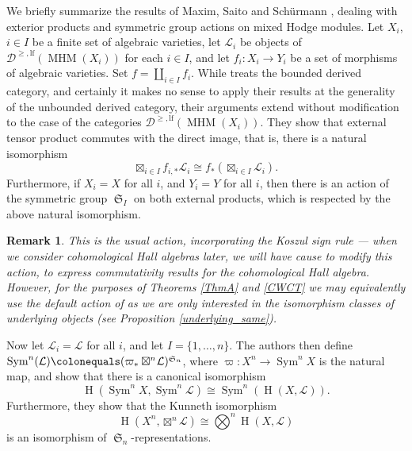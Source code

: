 \documentclass[a4paper,10pt]{amsart}
\newtheorem{remark}[theorem]{Remark}
\DeclareMathOperator{\MHM}{MHM}
\DeclareMathOperator{\Sym}{Sym}
\DeclareMathOperator{\SSym}{\mathfrak{S}}
\DeclareMathOperator{\HO}{H}
\newcommand{\Dulf}{\mathcal{D}^{\geq, \mathrm{lf}}}
\begin{document}
We briefly summarize the results of Maxim, Saito and Sch\"urmann \cite{MSS11}, dealing with exterior products and symmetric group actions on mixed Hodge modules.  Let $X_i$, $i\in I$ be a finite set of algebraic varieties, let $\mathcal{L}_i$ be objects of $\Dulf(\MHM(X_i))$ for each $i\in I$, and let $f_i\colon X_i\rightarrow Y_i$ be a set of morphisms of algebraic varieties.  Set $f=\coprod_{i\in I}f_i$.  While \cite{MSS11} treats the bounded derived category, and certainly it makes no sense to apply their results at the generality of the unbounded derived category, their arguments extend without modification to the case of the categories $\Dulf(\MHM(X_i))$.  They show that external tensor product commutes with the direct image, that is, there is a natural isomorphism
\[
\boxtimes_{i\in I}f_{i,*}\mathcal{L}_i\cong f_*\left(\boxtimes_{i\in I}\mathcal{L}_i\right).
\]
Furthermore, if $X_i=X$ for all $i$, and $Y_i=Y$ for all $i$, then there is an action of the symmetric group $\SSym_I$ on both external products, which is respected by the above natural isomorphism.  
\begin{remark}
This is the usual action, incorporating the Koszul sign rule --- when we consider cohomological Hall algebras later, we will have cause to modify this action, to express commutativity results for the cohomological Hall algebra.  However, for the purposes of Theorems \ref{ThmA} and \ref{CWCT} we may equivalently use the default action of \cite{MSS11} as we are only interested in the isomorphism classes of underlying objects (see Proposition \ref{underlying_same}).
\end{remark}
Now let $\mathcal{L}_i=\mathcal{L}$ for all $i$, and let $I=\{1,\ldots,n\}$.  The authors then define $\Sym^n(\mathcal{L})\colonequals (\varpi_*\boxtimes^n\!\mathcal{L})^{\SSym_n}$, where $\varpi\colon X^n\rightarrow \Sym^nX$ is the natural map, and show that there is a canonical isomorphism 
\[
\HO(\Sym^n X,\Sym^n\mathcal{L})\cong \Sym^n(\HO(X,\mathcal{L})).
\]
Furthermore, they show that the Kunneth isomorphism
\[
\HO(X^n,\boxtimes^n\mathcal{L})\cong \bigotimes^n\HO(X,\mathcal{L})
\]
is an isomorphism of $\SSym_n$-representations.  
\end{document}
